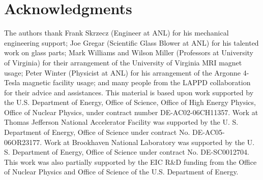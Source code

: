 \section{Acknowledgments}
The authors thank Frank Skrzecz (Engineer at ANL) for his mechanical 
engineering support; Joe Gregar (Scientific Glass Blower at ANL) for his 
talented work on glass parts; Mark Williams and Wilson Miller (Professors at 
University of Virginia) for their arrangement of the University of Virginia MRI 
magnet usage; Peter Winter (Physicist at ANL) for his arrangement of the 
Argonne 4-Tesla magnetic facility usage; and many people from the LAPPD 
collaboration for their advice and assistances. This material is based upon 
work supported by the U.S. Department of Energy, Office of Science, Office of 
High Energy Physics, Office of Nuclear Physics, under contract number 
DE-AC02-06CH11357. Work at Thomas Jefferson National Accelerator Facility was 
supported by the U. S. Department of Energy, Office of Science under contract 
No. DE-AC05-06OR23177. Work at Brookhaven National Laboratory was supported by 
the U. S. Department of Energy, Office of Science under contract No.  
DE-SC0012704. This work was also partially supported by the EIC R\&D funding 
from the Office of Nuclear Physics and Office of Science of the U.S.  
Department of Energy.
